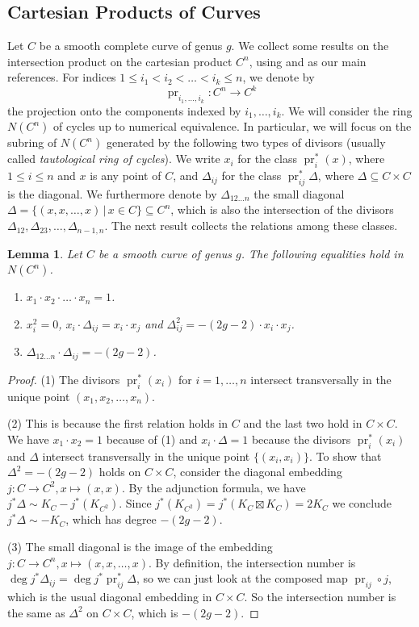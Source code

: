 \documentclass[12pt]{article}
\newtheorem{lemma}[theorem]{Lemma}
\numberwithin{equation}{section}
\theoremstyle{definition}
\DeclareMathOperator{\pr}{pr}
\begin{document}
\subsection{Cartesian Products of Curves}
Let $C$ be a smooth complete curve of genus $g$. We collect some results on the intersection product on the cartesian product $C^n$, using \cite{ACGH} and \cite{Bastetal} as our main references. For indices $1\leq i_1< i_2< \dots< i_k\leq n$, we denote by \[\operatorname{pr}_{i_1,\ldots,i_k}\colon C^n \to C^k\] the projection onto the components indexed by $i_1,\dots,i_k$. We will consider the ring $N(C^n)$ of cycles up to numerical equivalence. In particular, we will focus on the subring of $N(C^n)$ generated by the following two types of divisors (usually called \emph{tautological ring of cycles}). We write $x_i$ for the class $\pr_i^*(x)$, where $1\leq i \leq n$ and $x$ is any point of $C$, and $\Delta_{ij}$ for the class $\operatorname{pr}_{ij}^*\Delta$, where $\Delta\subseteq C\times C$ is the diagonal. We furthermore denote by $\Delta_{12\dots n}$ the small diagonal $\Delta = \{(x,x,\dots,x) \,|\, x\in C \} \subseteq C^n$, which is also the intersection of the divisors $\Delta_{12},\Delta_{23},\ldots,\Delta_{n-1,n}$.
The next result collects the relations among these classes.
\begin{lemma}\label{lemma:basicrelations}
	Let $C$ be a smooth curve of genus $g$. The following equalities hold in $N(C^n)$.
	\begin{enumerate}[label=(\arabic*)]
		\item $x_1\cdot x_2 \cdot \dots \cdot x_n = 1$.
		\item $x_i^2 = 0$,  $x_i\cdot \Delta_{ij} = x_i\cdot x_j$  and $\Delta_{ij}^2 = -(2g-2)\cdot x_i\cdot x_j$.
		\item $\Delta_{12\dots n} \cdot \Delta_{ij} = -(2g-2)$. 
	\end{enumerate}
\end{lemma}
\begin{proof}
	(1) The divisors $\pr_i^*(x_i)$ for $i=1,\ldots,n$ intersect transversally in the unique point $(x_1,x_2,\dots,x_n)$. 
	
	(2) This is because the first relation holds in $C$ and the last two hold in $C\times C$. We have $x_1\cdot x_2=1$ because of (1) and $x_i \cdot \Delta = 1$ because the divisors $\pr_i^*(x_i)$ and $\Delta$ intersect transversally in the unique point $\{(x_i,x_i)\}$. To show that $\Delta^2 = -(2g-2)$ holds on $C\times C$, consider the diagonal embedding $j\colon C \to C^2, x\mapsto (x,x)$. By the adjunction formula, we have $j^*\Delta \sim K_C - j^*(K_{C^2})$. Since $j^*(K_{C^2}) = j^*(K_C\boxtimes K_C) = 2K_C$ we conclude $j^*\Delta \sim -K_C$, which has degree $-(2g-2)$.
	
	(3) The small diagonal is the image of the embedding $j\colon C \to C^n, x\mapsto (x,x,\dots,x)$. By definition, the intersection number is $\deg j^*\Delta_{ij} = \deg j^*\operatorname{pr}_{ij}^*\Delta$, so we can just look at the composed map $\operatorname{pr}_{ij}\circ j$, which is the usual diagonal embedding in $C\times C$. So the intersection number is the same as $\Delta^2$ on $C\times C$, which is $-(2g-2)$. 
\end{proof} 
\end{document}
